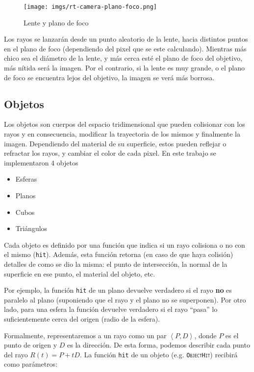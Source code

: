 \begin{figure}[H]
    \centering
    \texttt{[image: imgs/rt-camera-plano-foco.png]}
    \caption{Lente y plano de foco}
    \label{fig:rt-camera-plano-foco}
\end{figure}

Los rayos se lanzarán desde un punto aleatorio de la lente, hacia distintos
puntos en el plano de foco (dependiendo del pixel que se este calculando).
Mientras más chico sea el diámetro de la lente, y más cerca esté el plano de
foco del objetivo, más nítida será la imagen. Por el contrario, si la lente es
muy grande, o el plano de foco se encuentra lejos del objetivo, la imagen se
verá más borrosa.

\subsection{Objetos}

Los objetos son cuerpos del espacio tridimensional que pueden colisionar con los
rayos y en consecuencia, modificar la trayectoria de los mismos y finalmente  la
imagen. Dependiendo del material de su superficie, estos pueden reflejar o
refractar los rayos, y cambiar el color de cada pixel. En este trabajo se
implementaron 4 objetos

\begin{itemize}
    \item Esferas
    \item Planos
    \item Cubos
    \item Triángulos
\end{itemize}

Cada objeto es definido por una función que indica si un rayo colisiona o no con
el mismo (\texttt{hit}). Además, esta función retorna (en caso de que haya
colisión) detalles de como se dio la misma: el punto de intersección, la normal
de la superficie en ese punto, el material del objeto, etc.

Por ejemplo, la función \texttt{hit} de un plano devuelve verdadero si el rayo
\textbf{no} es paralelo al plano (suponiendo que el rayo y el plano no se
superponen). Por otro lado, para una esfera la función devuelve verdadero si el
rayo ``pasa'' lo suficientemente cerca del origen (radio de la esfera).

Formalmente, representaremos a un rayo como un par
$\left\langle P, D \right\rangle$, donde $P$ es el punto de origen y $D$ es la
dirección. De esta forma, podemos describir cada punto del rayo $R(t) = P + tD$.
La función \texttt{hit} de un objeto (e.g. \textsc{\texttt{ObjectHit}}) recibirá
como parámetros:

